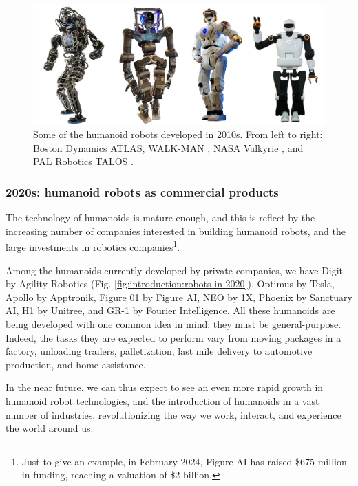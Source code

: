 \begin{figure}
    \centering
    \includegraphics[width=\textwidth]{figures/01-introduction/robots-in-2010.jpg}
    \caption{Some of the humanoid robots developed in 2010s. From left to right:
        Boston Dynamics ATLAS,
        WALK-MAN \cite{Tsagarakis2017WALKMAN},
        NASA Valkyrie \cite{Radford2015Valkyrie}, and
        PAL Robotics TALOS \cite{Stasse2017TALOS}.}
    \label{fig:introduction:robots-in-2010}
\end{figure}

\subsubsection{2020s: humanoid robots as commercial products}
The technology of humanoids is mature enough, and this is reflect by the 
increasing number of companies interested in building humanoid robots, and the 
large investments in robotics companies\footnote{Just to give an example,
in February 2024, Figure AI has raised \$675 million in funding, reaching 
a valuation of \$2 billion.}.

Among the humanoids currently developed by private companies, we have Digit 
by Agility Robotics (Fig. \ref{fig:introduction:robots-in-2020}), Optimus by
Tesla, Apollo by Apptronik, Figure 01 by Figure AI, NEO by 1X, Phoenix by 
Sanctuary AI, H1 by Unitree, and GR-1 by Fourier Intelligence. All these 
humanoids are being developed with one common idea in mind: they must be 
general-purpose. Indeed, the tasks they are expected to perform vary from 
moving packages in a factory, unloading trailers, palletization,
last mile delivery to automotive production, and home assistance.

In the near future, we can thus expect to see an even more rapid growth in 
humanoid robot technologies, and the introduction of humanoids in a vast 
number of industries, revolutionizing the way we work, interact,
and experience the world around us.

